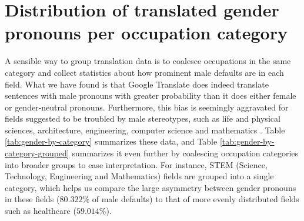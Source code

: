\documentclass[fleqn,10pt]{article}
\begin{document}
\section{Distribution of translated gender pronouns per occupation category}

A sensible way to group translation data is to coalesce occupations in the same category and collect statistics about how prominent male defaults are in each field. What we have found is that Google Translate does indeed translate sentences with male pronouns with greater probability than it does either female or gender-neutral pronouns. Furthermore, this bias is seemingly aggravated for fields suggested to be troubled by male stereotypes, such as life and physical sciences, architecture, engineering, computer science and mathematics \citep{moss2015can}. Table \ref{tab:gender-by-category} summarizes these data, and Table \ref{tab:gender-by-category-grouped} summarizes it even further by coalescing occupation categories into broader groups to ease interpretation. For instance, STEM (Science, Technology, Engineering and Mathematics) fields are grouped into a single category, which helps us compare the large asymmetry between gender pronouns in these fields ($80.322\%$ of male defaults) to that of more evenly distributed fields such as healthcare ($59.014\%$).
\end{document}

